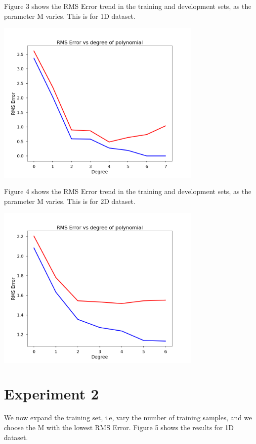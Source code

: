 \documentclass[11pt]{article}
\begin{document}
Figure 3 shows the RMS Error trend in the training and development sets, as the parameter M varies. This is for 1D dataset.

\begin{center}
  \includegraphics[width=10cm]
  {regression/1d-ls-train-dev-fig.png}
\end{center}

Figure 4 shows the RMS Error trend in the training and development sets, as the parameter M varies. This is for 2D dataset.

\begin{center}
  \includegraphics[width=10cm]
{regression/2d-ls-train-dev-fig.png}
\end{center}


\section*{Experiment 2}
We now expand the training set, i.e, vary the number of training samples, and we choose the M with the lowest RMS Error. Figure 5 shows the results for 1D dataset.
\end{document}
